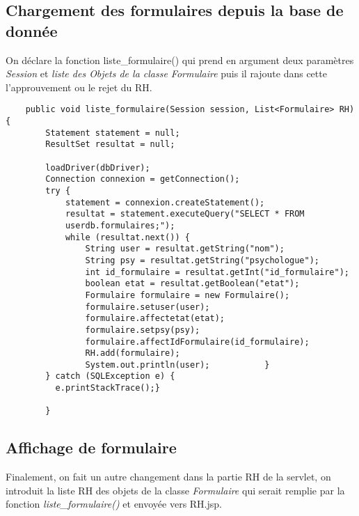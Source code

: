 \documentclass[12]{article}
\begin{document}
\subsection{Chargement des formulaires depuis la base de donnée}

On déclare la fonction liste\_formulaire() qui prend en argument deux paramètres \textit{Session} et \textit{liste des Objets de la classe Formulaire} puis il rajoute dans cette l'approuvement ou le rejet du RH.

\lstset{language=java}
\begin{lstlisting}
	public void liste_formulaire(Session session, List<Formulaire> RH) {
        Statement statement = null;
        ResultSet resultat = null;

        loadDriver(dbDriver);
        Connection connexion = getConnection();
        try {
            statement = connexion.createStatement();
            resultat = statement.executeQuery("SELECT * FROM 
            userdb.formulaires;");
            while (resultat.next()) {
                String user = resultat.getString("nom");
                String psy = resultat.getString("psychologue");
                int id_formulaire = resultat.getInt("id_formulaire");
                boolean etat = resultat.getBoolean("etat");
                Formulaire formulaire = new Formulaire();
                formulaire.setuser(user);
                formulaire.affectetat(etat);
                formulaire.setpsy(psy);
                formulaire.affectIdFormulaire(id_formulaire);
                RH.add(formulaire);
                System.out.println(user);           }
        } catch (SQLException e) {
          e.printStackTrace();}
            
        }
\end{lstlisting}

\subsection{Affichage de formulaire}

Finalement, on fait un autre changement dans la partie RH de la servlet, on introduit la liste RH des objets de la classe \textit{Formulaire} qui serait remplie par la fonction \textit{liste\_formulaire()} et envoyée vers RH.jsp.
\end{document}
